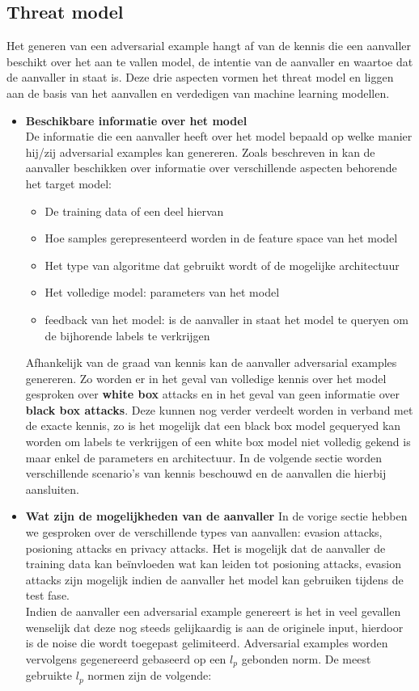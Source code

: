 \documentclass{article}
\begin{document}
\begin{multicols*}{2}
\subsection{Threat model}

Het generen van een adversarial example hangt af van de kennis die een aanvaller beschikt over het aan te vallen model, de intentie van de aanvaller en waartoe dat de aanvaller in staat is. Deze drie aspecten vormen het threat model en liggen aan de basis van het aanvallen en verdedigen van machine learning modellen. \\
\begin{itemize}
    \item \textbf{Beschikbare informatie over het model} \\ 
        De informatie die een aanvaller heeft over het model bepaald op welke manier hij/zij adversarial examples kan genereren. Zoals beschreven in \cite{Biggio_2013} kan de aanvaller beschikken over informatie over verschillende aspecten behorende het target model:
        \begin{itemize}
            \item De training data of een deel hiervan
            \item Hoe samples gerepresenteerd worden in de feature space van het model
            \item Het type van algoritme dat gebruikt wordt of de mogelijke architectuur
            \item Het volledige model: parameters van het model
            \item feedback van het model: is de aanvaller in staat het model te queryen om de bijhorende labels te verkrijgen
        \end{itemize}
        Afhankelijk van de graad van kennis kan de aanvaller adversarial examples genereren. Zo worden er in het geval van volledige kennis over het model gesproken over \textbf{white box} attacks en in het geval van geen informatie over \textbf{black box attacks}. Deze kunnen nog verder verdeelt worden in verband met de exacte kennis, zo is het mogelijk dat een black box model gequeryed kan worden om labels te verkrijgen of een white box model niet volledig gekend is maar enkel de parameters en architectuur. In de volgende sectie worden verschillende scenario's van kennis beschouwd en de aanvallen die hierbij aansluiten.
    \item \textbf{Wat zijn de mogelijkheden van de aanvaller}
        In de vorige sectie hebben we gesproken over de verschillende types van aanvallen: evasion attacks, posioning attacks en privacy attacks. Het is mogelijk dat de aanvaller de training data kan beïnvloeden wat kan leiden tot posioning attacks, evasion attacks zijn mogelijk indien de aanvaller het model kan gebruiken tijdens de test fase. \\ Indien de aanvaller een adversarial example genereert is het in veel gevallen wenselijk dat deze nog steeds gelijkaardig is aan de originele input, hierdoor is de noise die wordt toegepast gelimiteerd. Adversarial examples worden vervolgens gegenereerd gebaseerd op een $l_p$ gebonden norm. De meest gebruikte $l_p$ normen zijn de volgende:

\end{itemize}
\end{multicols*}
\end{document}
